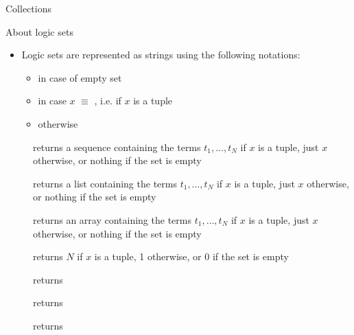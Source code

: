 \documentclass[handout]{beamer}
\begin{document}
\begin{frame}[allowframebreaks]{Collections}
\begin{alertblock}{About logic sets}
\begin{itemize}
            \item Logic sets are represented as strings using the following notations:
            \begin{itemize}
                \item \pl{\{\}} in case of empty set
                \item {} in case $x$ $\equiv$ , i.e. if $x$ is a tuple
                \item {} otherwise
            \end{itemize}
        \end{itemize}
    \end{alertblock}
    \begin{description}
        \item[] returns a sequence containing the terms $t_1, \ldots, t_N$ if $x$ is a tuple, just $x$ otherwise, or nothing if the set is empty
        \item[] returns a list containing the terms $t_1, \ldots, t_N$ if $x$ is a tuple, just $x$ otherwise, or nothing if the set is empty
        \item[] returns an array containing the terms $t_1, \ldots, t_N$ if $x$ is a tuple, just $x$ otherwise, or nothing if the set is empty
        \item[] returns $N$ if $x$ is a tuple, 1 otherwise, or 0 if the set is empty
        \item[] returns 
        \item[] returns 
        \item[] returns 
    \end{description}


\end{frame}
\end{document}
